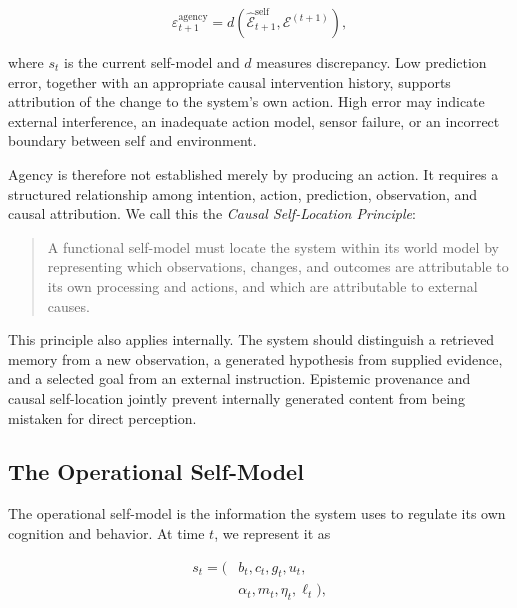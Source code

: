 \begin{equation}
\varepsilon_{t+1}^{\mathrm{agency}}
=
d\!\left(
\widehat{\mathcal{E}}_{t+1}^{\mathrm{self}},
\mathcal{E}^{(t+1)}
\right),
\label{eq:agency-error}
\end{equation}

where $s_t$ is the current self-model and $d$ measures discrepancy. Low prediction error, together with an appropriate causal intervention history, supports attribution of the change to the system's own action. High error may indicate external interference, an inadequate action model, sensor failure, or an incorrect boundary between self and environment.

Agency is therefore not established merely by producing an action. It requires a structured relationship among intention, action, prediction, observation, and causal attribution. We call this the \emph{Causal Self-Location Principle}:

\begin{quote}
A functional self-model must locate the system within its world model by representing which observations, changes, and outcomes are attributable to its own processing and actions, and which are attributable to external causes.
\end{quote}

This principle also applies internally. The system should distinguish a retrieved memory from a new observation, a generated hypothesis from supplied evidence, and a selected goal from an external instruction. Epistemic provenance and causal self-location jointly prevent internally generated content from being mistaken for direct perception.

\subsection{The Operational Self-Model}
\label{subsec:operational-self-model}

The operational self-model is the information the system uses to regulate its own cognition and behavior. At time $t$, we represent it as

\begin{equation}
\begin{aligned}
s_t
=
\bigl(
&b_t,
c_t,
g_t,
u_t,\\
&\alpha_t,
m_t,
\eta_t,
\ell_t
\bigr),
\end{aligned}
\label{eq:operational-self-model}
\end{equation}

